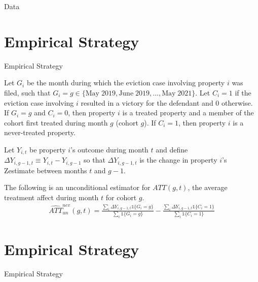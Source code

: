 \documentclass [xcolor=svgnames, t] {beamer}
\begin{document}
\begin{frame}{Data}
\begin{table}[H]
    \centering
    \tiny
    
    \label{tab:my_label}
\end{table}
\end{frame}




\section{Empirical Strategy}
\begin{frame}{Empirical Strategy}

    
    Let $G_i$ be the month during which the eviction case involving property $i$ was filed, such that $G_i = g \in \{\text{May} \; 2019, \text{June} \; 2019, ..., \text{May} \; 2021\}$. Let $C_i = 1$ if the eviction case involving $i$ resulted in a victory for the defendant and $0$ otherwise. If $G_i = g$ and $C_i = 0$, then property $i$ is a treated property and a member of the cohort first treated during month $g$ (cohort $g$). If $C_i=1$, then property $i$ is a never-treated property. 
    
    Let $Y_{i,t}$ be property $i$'s outcome during month $t$ and define $\Delta Y_{i, g-1, t} \equiv Y_{i,t} - Y_{i,g-1}$ so that $\Delta Y_{i, g-1, t}$ is the change in property $i$'s Zestimate between months $t$ and $g-1$.

    

    The following is an unconditional estimator for $ATT(g,t)$, the average treatment affect during month $t$ for cohort $g$.
    \begin{align}
        \hat{ATT}^{nev}_{un}(g, t) = \frac{\sum_i\Delta Y_{i, g-1, t}\mathds{1}\{G_i=g\}}{\sum_i\mathds{1}\{G_i=g\}} - \frac{\sum_i\Delta Y_{i, g-1, t}\mathds{1}\{C_i=1\}}{\sum_i\mathds{1}\{C_i=1\}}
    \end{align}

\end{frame}

\section{Empirical Strategy}
\begin{frame}{Empirical Strategy}
\begin{table}[H]
    \centering
    \tiny
    
    \label{tab:my_label}
\end{table}
\end{frame}
\end{document}
